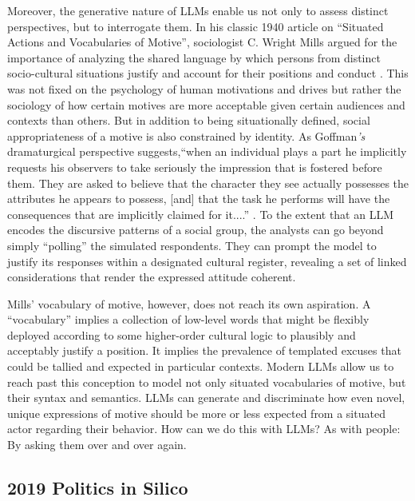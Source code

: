 \documentclass{article}
\begin{document}
Moreover, the generative nature of LLMs enable us not only to assess
distinct perspectives, but to interrogate them. In his classic 1940
article on ``Situated Actions and Vocabularies of Motive'', sociologist
C. Wright Mills argued for the importance of analyzing the shared
language by which persons from distinct socio-cultural situations
justify and account for their positions and conduct
\parencite{Mills1940-xp}. This was not
fixed on the psychology of human motivations and drives but rather the
sociology of how certain motives are more acceptable given certain
audiences and contexts than others. But in addition to being
situationally defined, social appropriateness of a motive is also
constrained by identity. As Goffman\emph{'s} dramaturgical perspective
suggests,``when an individual plays a part he implicitly requests his
observers to take seriously the impression that is fostered before them.
They are asked to believe that the character they see actually possesses
the attributes he appears to possess, {[}and{]} that the task he
performs will have the consequences that are implicitly claimed for
it....'' \parencite{Goffman2021-xf}. To the extent that an LLM encodes the discursive patterns of a
social group, the analysts can go beyond simply ``polling'' the
simulated respondents. They can prompt the model to justify its
responses within a designated cultural register, revealing a set of
linked considerations that render the expressed attitude coherent.

Mills' vocabulary of motive, however, does not reach its own aspiration.
A ``vocabulary'' implies a collection of low-level words that might be
flexibly deployed according to some higher-order cultural logic to
plausibly and acceptably justify a position. It implies the prevalence
of templated excuses that could be tallied and expected in particular
contexts. Modern LLMs allow us to reach past this conception to model
not only situated vocabularies of motive, but their syntax and
semantics. LLMs can generate and discriminate how even novel, unique
expressions of motive should be more or less expected from a situated
actor regarding their behavior. How can we do this with LLMs? As with
people: By asking them over and over again.

\subsection*{2019 Politics in Silico}
\end{document}
